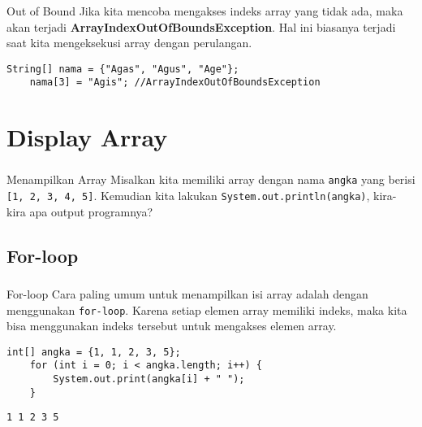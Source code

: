 \documentclass[aspectratio=169]{beamer}
\theoremstyle{definition}
\begin{document}
    \begin{frame}[fragile]
        \frametitle{\insertsection}
        \framesubtitle{\insertsubsection}
        \begin{alertblock}{Out of Bound}
            Jika kita mencoba mengakses indeks array yang tidak ada, maka akan terjadi \textbf{\color{red}ArrayIndexOutOfBoundsException}. Hal ini biasanya terjadi saat kita mengeksekusi array dengan perulangan.
        \end{alertblock}
        \begin{lstlisting}[caption={Contoh eror dalam array}]
    String[] nama = {"Agas", "Agus", "Age"};
    nama[3] = "Agis"; //ArrayIndexOutOfBoundsException
        \end{lstlisting}
    \end{frame}

    \section{Display Array}
    \begin{frame}
        \frametitle{\insertsection}
        \begin{block}{Menampilkan Array}
            Misalkan kita memiliki array dengan nama \texttt{angka} yang berisi \texttt{[1, 2, 3, 4, 5]}. Kemudian kita lakukan \texttt{System.out.println(angka)}, kira-kira apa output programnya?
        \end{block}
    \end{frame}

    \subsection{For-loop}
    \begin{frame}[fragile]
        \frametitle{\insertsection}
        \framesubtitle{\insertsubsection}
        \begin{block}{For-loop}
            Cara paling umum untuk menampilkan isi array adalah dengan menggunakan \texttt{for-loop}. Karena setiap elemen array memiliki indeks, maka kita bisa menggunakan indeks tersebut untuk mengakses elemen array.
        \end{block}
        \begin{lstlisting}[caption={Menampilkan array dengan for-loop}]
    int[] angka = {1, 1, 2, 3, 5};
    for (int i = 0; i < angka.length; i++) {
        System.out.print(angka[i] + " ");
    }
        \end{lstlisting}
        \begin{lstlisting}[style=output]
    1 1 2 3 5
        \end{lstlisting}
    \end{frame}
\end{document}
